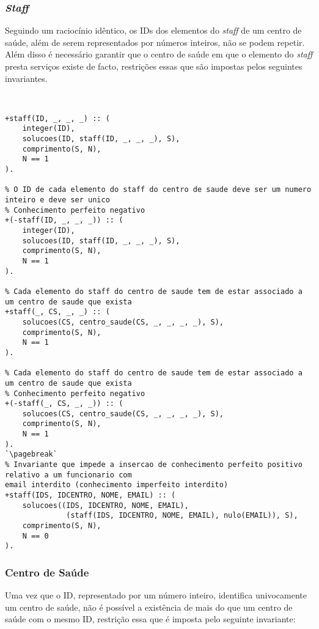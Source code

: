 \subsubsection*{\textit{Staff}}

Seguindo um raciocínio idêntico, os IDs dos elementos do \textit{staff} de um centro de saúde, 
além de serem representados
por números inteiros, não se podem repetir. Além disso é necessário garantir que o centro de 
saúde em que o elemento do
\textit{staff} presta serviços existe de facto, restrições essas que são impostas pelos 
seguintes invariantes.

\

\begin{lstlisting}[caption={Invariantes de inserção relativos ao predicado \texttt{staff}}]
% O ID de cada elemento do staff do centro de saude deve ser um numero inteiro e deve ser unico
+staff(ID, _, _, _) :: (
    integer(ID),
    solucoes(ID, staff(ID, _, _, _), S),
    comprimento(S, N),
    N == 1
).

% O ID de cada elemento do staff do centro de saude deve ser um numero inteiro e deve ser unico
% Conhecimento perfeito negativo
+(-staff(ID, _, _, _)) :: (
    integer(ID),
    solucoes(ID, staff(ID, _, _, _), S),
    comprimento(S, N),
    N == 1
).

% Cada elemento do staff do centro de saude tem de estar associado a um centro de saude que exista
+staff(_, CS, _, _) :: (
    solucoes(CS, centro_saude(CS, _, _, _, _), S),
    comprimento(S, N),
    N == 1
).

% Cada elemento do staff do centro de saude tem de estar associado a um centro de saude que exista
% Conhecimento perfeito negativo
+(-staff(_, CS, _, _)) :: (
    solucoes(CS, centro_saude(CS, _, _, _, _), S),
    comprimento(S, N),
    N == 1
).
`\pagebreak`
% Invariante que impede a insercao de conhecimento perfeito positivo relativo a um funcionario com 
email interdito (conhecimento imperfeito interdito)
+staff(IDS, IDCENTRO, NOME, EMAIL) :: (
    solucoes((IDS, IDCENTRO, NOME, EMAIL),
              (staff(IDS, IDCENTRO, NOME, EMAIL), nulo(EMAIL)), S),
    comprimento(S, N),
    N == 0
).

\end{lstlisting}

\subsubsection*{Centro de Saúde}
Uma vez que o ID, representado por um número inteiro, identifica univocamente um centro de saúde, 
não é possível a existência
de mais do que um centro de saúde com o mesmo ID, restrição essa que é imposta pelo seguinte 
invariante:


